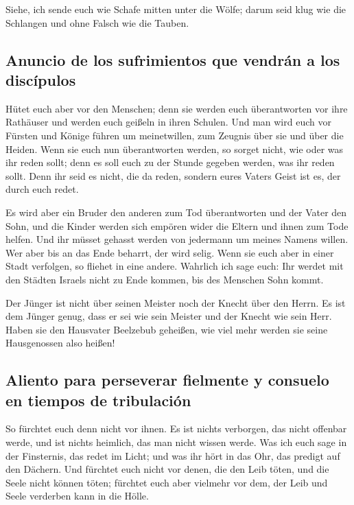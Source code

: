  Siehe, ich sende euch wie Schafe mitten unter die Wölfe;
darum seid klug wie die Schlangen und ohne Falsch wie die Tauben.

\hypertarget{anuncio-de-los-sufrimientos-que-vendruxe1n-a-los-discuxedpulos}{%
\subsection{Anuncio de los sufrimientos que vendrán a los
discípulos}\label{anuncio-de-los-sufrimientos-que-vendruxe1n-a-los-discuxedpulos}}

 Hütet euch aber vor den Menschen; denn sie werden euch
überantworten vor ihre Rathäuser und werden euch geißeln in ihren
Schulen.  Und man wird euch vor Fürsten und Könige führen
um meinetwillen, zum Zeugnis über sie und über die Heiden.
 Wenn sie euch nun überantworten werden, so sorget nicht,
wie oder was ihr reden sollt; denn es soll euch zu der Stunde gegeben
werden, was ihr reden sollt.  Denn ihr seid es nicht, die
da reden, sondern eures Vaters Geist ist es, der durch euch redet.

 Es wird aber ein Bruder den anderen zum Tod
überantworten und der Vater den Sohn, und die Kinder werden sich empören
wider die Eltern und ihnen zum Tode helfen.  Und ihr
müsset gehasst werden von jedermann um meines Namens willen. Wer aber
bis an das Ende beharrt, der wird selig.  Wenn sie euch
aber in einer Stadt verfolgen, so fliehet in eine andere. Wahrlich ich
sage euch: Ihr werdet mit den Städten Israels nicht zu Ende kommen, bis
des Menschen Sohn kommt.

 Der Jünger ist nicht über seinen Meister noch der Knecht
über den Herrn.  Es ist dem Jünger genug, dass er sei wie
sein Meister und der Knecht wie sein Herr. Haben sie den Hausvater
Beelzebub geheißen, wie viel mehr werden sie seine Hausgenossen also
heißen!

\hypertarget{aliento-para-perseverar-fielmente-y-consuelo-en-tiempos-de-tribulaciuxf3n}{%
\subsection{Aliento para perseverar fielmente y consuelo en tiempos de
tribulación}\label{aliento-para-perseverar-fielmente-y-consuelo-en-tiempos-de-tribulaciuxf3n}}

 So fürchtet euch denn nicht vor ihnen. Es ist nichts
verborgen, das nicht offenbar werde, und ist nichts heimlich, das man
nicht wissen werde.  Was ich euch sage in der Finsternis,
das redet im Licht; und was ihr hört in das Ohr, das predigt auf den
Dächern.  Und fürchtet euch nicht vor denen, die den Leib
töten, und die Seele nicht können töten; fürchtet euch aber vielmehr vor
dem, der Leib und Seele verderben kann in die Hölle.

